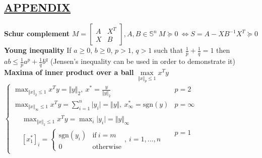 \documentclass[a4paper]{article}
\begin{document}
\subsection*{\underline{APPENDIX}}
\textbf{Schur complement} $M=\begin{bmatrix}
    A&X^T\\
    X&B
\end{bmatrix}, A,B\in\mathbb{S}^n \ M\succeq0 \  \iff S=A-XB^{-1}X^T\succeq0$  \\
\textbf{Young inequality} If $a\ge0$, $b\ge0$, $p>1$, $q>1$ such that $\frac{1}{p}+\frac{1}{q}=1$ then $ab \le \frac{1}{p}{a^p}+\frac{1}{q}{b^q}$ \textsf{(Jensen's inequality can be used in order to demonstrate it)}\\
\textbf{Maxima of inner product over a ball} $\underset{\Vert x \Vert_p \le 1}{\max} x^Ty$ $\begin{cases}
    \max_{\Vert x \Vert_2\le1}{x^T{y}}=\Vert{y}\Vert_2, \ x^{*}=\frac{y}{\Vert{y}\Vert_2}&{p=2}\\
    \max_{\Vert{x}\Vert_\infty\le1}{x^T{y}}=\sum_{i=1}^{n}{\vert{y_i}\vert}=\Vert{y}\Vert, \ x^{*}_\infty=\text{sgn}(y)&{p=\infty}\\
    \begin{aligned}
        &\max_{\Vert{x}\Vert_1\le{1}}{x^T{y}}=\max_i{\vert{y_i}\vert}=\Vert{y}\Vert_\infty \\
        &[x_1^{*}]_i=\begin{cases}
           \text{sgn}(y_i)&\text{if} \ i=m\\
           0&\text{otherwise}
       \end{cases}, \ i=1,...,n
    \end{aligned}&p=1
   
\end{cases}$
\end{document}
